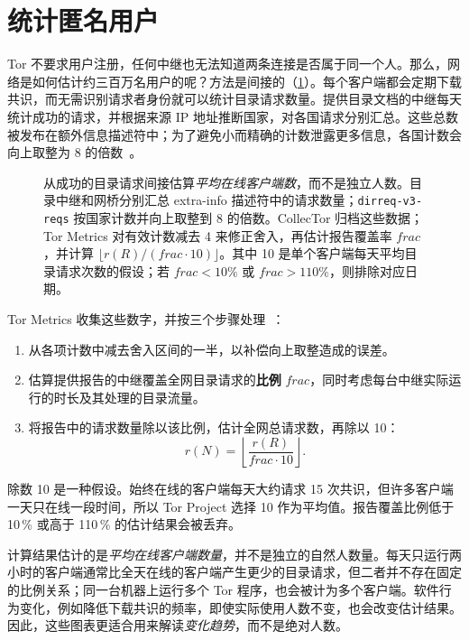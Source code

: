 \section{统计匿名用户}\label{sec:metrics-utenti}

Tor 不要求用户注册，任何中继也无法知道两条连接是否属于同一个人。那么，网络是如何估计约三百万名用户的呢？方法是间接的（\cref{fig:stima}）。每个客户端都会定期下载共识，而无需识别请求者身份就可以统计目录请求数量。提供目录文档的中继每天统计成功的请求，并根据来源 IP 地址推断国家，对各国请求分别汇总。这些总数被发布在额外信息描述符中；为了避免小而精确的计数泄露更多信息，各国计数会向上取整为 8 的倍数~。

\begin{figure}[htbp]
\centering

\caption{从成功的目录请求间接估算\emph{平均在线客户端数}，而不是独立人数。目录中继和网桥分别汇总 extra-info 描述符中的请求数量；\texttt{dirreq-v3-reqs} 按国家计数并向上取整到 8 的倍数。CollecTor 归档这些数据；Tor Metrics 对有效计数减去 4 来修正舍入，再估计报告覆盖率 $\mathit{frac}$，并计算 $\lfloor r(R)/(\mathit{frac}\cdot10)\rfloor$。其中 10 是单个客户端每天平均目录请求次数的假设；若 $\mathit{frac}<10\%$ 或 $\mathit{frac}>110\%$，则排除对应日期。}
\label{fig:stima}
\end{figure}

Tor Metrics 收集这些数字，并按三个步骤处理~\cite{metricsreproducible}：
\begin{enumerate}
  \item 从各项计数中减去舍入区间的一半，以补偿向上取整造成的误差。
  \item 估算提供报告的中继覆盖全网目录请求的\textbf{比例} $\mathit{frac}$，同时考虑每台中继实际运行的时长及其处理的目录流量。
  \item 将报告中的请求数量除以该比例，估计全网总请求数，再除以 10：
  \[ r(N) = \left\lfloor \frac{r(R)}{\mathit{frac} \cdot 10} \right\rfloor. \]
\end{enumerate}
除数 10 是一种假设。始终在线的客户端每天大约请求 15 次共识，但许多客户端一天只在线一段时间，所以 Tor Project 选择 10 作为平均值。报告覆盖比例低于 10\,\% 或高于 110\,\% 的估计结果会被丢弃。

\begin{attenzione}
计算结果估计的是\emph{平均在线客户端数量}，并不是独立的自然人数量。每天只运行两小时的客户端通常比全天在线的客户端产生更少的目录请求，但二者并不存在固定的比例关系；同一台机器上运行多个 Tor 程序，也会被计为多个客户端。软件行为变化，例如降低下载共识的频率，即使实际使用人数不变，也会改变估计结果。因此，这些图表更适合用来解读\emph{变化趋势}，而不是绝对人数。
\end{attenzione}

